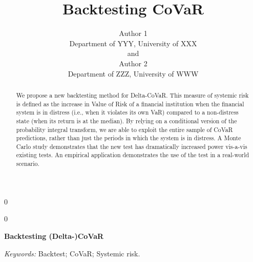 \documentclass[12pt]{article}
\newcommand{\blind}{0}
\begin{document}
%

\def\spacingset#1{\renewcommand{\baselinestretch}%
{#1}\small\normalsize} \spacingset{1}



\blind
{
  \title{\bf Backtesting CoVaR}
  \author{Author 1\\
    Department of YYY, University of XXX\\
    and \\
    Author 2 \\
    Department of ZZZ, University of WWW}
  \maketitle
} \fi

\blind
{
  \bigskip
  \bigskip
  \bigskip
  \begin{center}
    {\LARGE\bf Backtesting (Delta-)CoVaR}
\end{center}
  \medskip
} \fi

\bigskip
\begin{abstract}
We propose a new backtesting method for Delta-CoVaR. This measure of systemic risk is defined as the increase in Value of Risk of a financial institution when the financial system is in distress (i.e., when it violates its own VaR) compared to a non-distress state (when its return is at the median). By relying on a conditional version of the probability integral transform, we are able to exploit the entire sample of CoVaR predictions, rather than just the periods in which the system is in distress. A Monte Carlo study demonstrates that the new test has dramatically increased power vis-a-vis existing tests. An empirical application demonstrates the use of the test in a real-world scenario.
\end{abstract}
{\it Keywords:}  Backtest; CoVaR; Systemic risk.
\vfill
\end{document}
